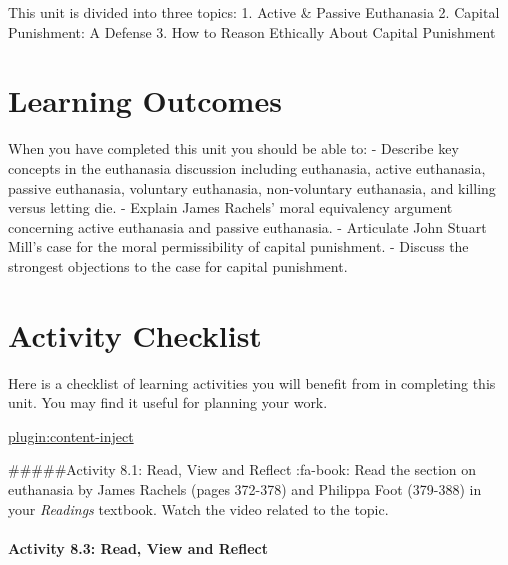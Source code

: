 \documentclass[
]{book}
\begin{document}
This unit is divided into three topics:
1. Active \& Passive Euthanasia
2. Capital Punishment: A Defense
3. How to Reason Ethically About Capital Punishment

\hypertarget{learning-outcomes-7}{%
\section{Learning Outcomes}\label{learning-outcomes-7}}

When you have completed this unit you should be able to:
- Describe key concepts in the euthanasia discussion including euthanasia, active euthanasia, passive euthanasia, voluntary euthanasia, non-voluntary euthanasia, and killing versus letting die.
- Explain James Rachels' moral equivalency argument concerning active euthanasia and passive euthanasia.
- Articulate John Stuart Mill's case for the moral permissibility of capital punishment.
- Discuss the strongest objections to the case for capital punishment.

\hypertarget{activity-checklist-7}{%
\section{Activity Checklist}\label{activity-checklist-7}}

Here is a checklist of learning activities you will benefit from in completing
this unit. You may find it useful for planning your work.

\href{_schedule}{plugin:content-inject}

\#\#\#\#\#Activity 8.1: Read, View and Reflect
:fa-book: Read the section on euthanasia by James Rachels (pages 372-378) and Philippa Foot (379-388) in your \emph{Readings} textbook. Watch the video related to the topic.

\hypertarget{activity-8.3-read-view-and-reflect}{%
\paragraph{Activity 8.3: Read, View and Reflect}\label{activity-8.3-read-view-and-reflect}}
\end{document}
